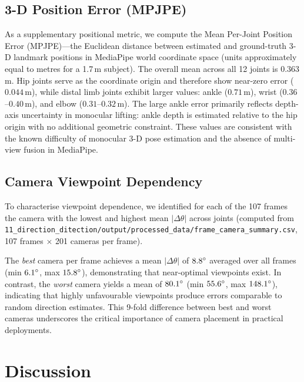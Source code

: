 \documentclass[twocolumn]{article}
\begin{document}
\subsection{3-D Position Error (MPJPE)}

As a supplementary positional metric, we compute the Mean Per-Joint
Position Error (MPJPE)---the Euclidean distance between estimated and
ground-truth 3-D landmark positions in MediaPipe world coordinate space
(units approximately equal to metres for a 1.7\,m subject).
The overall mean across all 12 joints is $0.363$\,m.
Hip joints serve as the coordinate origin and therefore show near-zero
error ($0.044$\,m), while distal limb joints exhibit larger values:
ankle ($0.71$\,m), wrist ($0.36$--$0.40$\,m), and elbow
($0.31$--$0.32$\,m).
The large ankle error primarily reflects depth-axis uncertainty in
monocular lifting: ankle depth is estimated relative to the hip origin
with no additional geometric constraint.
These values are consistent with the known difficulty of monocular 3-D
pose estimation and the absence of multi-view fusion in MediaPipe.

\subsection{Camera Viewpoint Dependency}

To characterise viewpoint dependence, we identified for each of the
107 frames the camera with the lowest and highest mean $|\Delta\theta|$
across joints (computed from
\texttt{11\_direction\_ditection/output/processed\_data/frame\_camera\_summary.csv},
107 frames $\times$ 201 cameras per frame).

The \emph{best} camera per frame achieves a mean $|\Delta\theta|$ of
$8.8\degree{}$ averaged over all frames (min $6.1\degree{}$, max $15.8\degree{}$), demonstrating
that near-optimal viewpoints exist. In contrast, the \emph{worst} camera
yields a mean of $80.1\degree{}$ (min $55.6\degree{}$, max $148.1\degree{}$), indicating that
highly unfavourable viewpoints produce errors comparable to random
direction estimates. This 9-fold difference between best and worst cameras
underscores the critical importance of camera placement in practical
deployments.

\section{Discussion}
\end{document}

